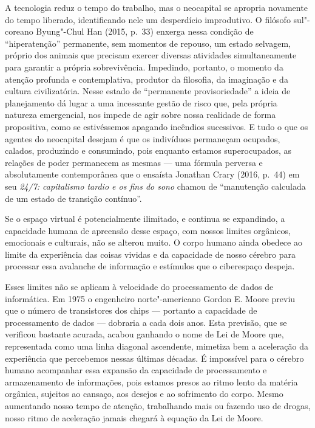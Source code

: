 A tecnologia reduz o tempo do trabalho, mas o neocapital se apropria
novamente do tempo liberado, identificando nele um desperdício
improdutivo. O filósofo sul"-coreano Byung"-Chul Han (2015, p.~33) enxerga
nessa condição de ``hiperatenção'' permanente, sem momentos de repouso,
um estado selvagem, próprio dos animais que precisam exercer diversas
atividades simultaneamente para garantir a própria sobrevivência.
Impedindo, portanto, o momento da atenção profunda e contemplativa,
produtor da filosofia, da imaginação e da cultura civilizatória. Nesse estado de
``permanente provisoriedade'' a ideia de planejamento dá lugar a uma
incessante gestão de risco que, pela própria natureza emergencial, nos
impede de agir sobre nossa realidade de forma propositiva, como se
estivéssemos apagando incêndios sucessivos. E tudo o que os agentes do
neocapital desejam é que os indivíduos permaneçam ocupados, calados,
produzindo e consumindo, pois enquanto estamos superocupados, as
relações de poder permanecem as mesmas --- uma fórmula perversa e
absolutamente contemporânea que o ensaísta Jonathan Crary (2016, p.~44)
em seu \emph{24/7: capitalismo tardio e os fins do sono} chamou de
``manutenção calculada de um estado de transição contínuo''.

Se o espaço virtual é potencialmente ilimitado, e continua se
expandindo, a capacidade humana de apreensão desse espaço, com nossos
limites orgânicos, emocionais e culturais, não se alterou muito. O corpo
humano ainda obedece ao limite da experiência das coisas vividas e da
capacidade de nosso cérebro para processar essa avalanche de informação
e estímulos que o ciberespaço despeja.

Esses limites não se aplicam à velocidade do processamento de dados de
informática. Em 1975 o engenheiro norte"-americano Gordon E. Moore previu
que o número de transistores dos chips --- portanto a capacidade de
processamento de dados --- dobraria a cada dois anos. Esta previsão, que
se verificou bastante acurada, acabou ganhando o nome de Lei de Moore que, representada como uma linha diagonal ascendente, mimetiza bem a aceleração da experiência que percebemos nessas últimas décadas. É
impossível para o cérebro humano acompanhar essa expansão da capacidade de
processamento e armazenamento de informações, pois estamos presos ao
ritmo lento da matéria orgânica, sujeitos ao cansaço, aos desejos e ao
sofrimento do corpo. Mesmo aumentando nosso tempo de atenção, trabalhando mais ou
fazendo uso de drogas, nosso ritmo de aceleração jamais chegará à
equação da Lei de Moore.

